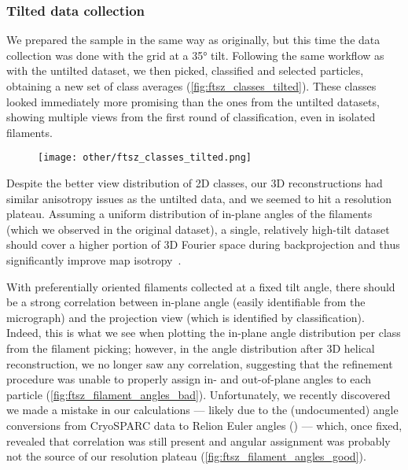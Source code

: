 \subsubsection{Tilted data collection}\label{ftsz_tilted}

We prepared the sample in the same way as originally, but this time the data collection was done with the grid at a 35° tilt.
Following the same workflow as with the untilted dataset, we then picked, classified and selected particles, obtaining a new set of class averages (\autoref{fig:ftsz_classes_tilted}).
These classes looked immediately more promising than the ones from the untilted datasets, showing multiple views from the first round of classification, even in isolated filaments. %

\begin{figure}[ht]
    \centering
    \texttt{[image: other/ftsz\_classes\_tilted.png]}
    \label{fig:ftsz_classes_tilted}
\end{figure}

Despite the better view distribution of 2D classes, our 3D reconstructions had similar anisotropy issues as the untilted data, and we seemed to hit a resolution plateau.
Assuming a uniform distribution of in-plane angles of the filaments (which we observed in the original dataset), a single, relatively high-tilt dataset should cover a higher portion of 3D Fourier space during backprojection and thus significantly improve map isotropy~\cite{tanAddressingPreferredSpecimen2017}.

With preferentially oriented filaments collected at a fixed tilt angle, there should be a strong correlation between in-plane angle (easily identifiable from the micrograph) and the projection view (which is identified by classification).
Indeed, this is what we see when plotting the in-plane angle distribution per class from the filament picking;
however, in the angle distribution after 3D helical reconstruction, we no longer saw any correlation, suggesting that the refinement procedure was unable to properly assign in- and out-of-plane angles to each particle (\autoref{fig:ftsz_filament_angles_bad}).
Unfortunately, we recently discovered we made a mistake in our calculations --- likely due to the (undocumented) angle conversions from CryoSPARC data to Relion Euler angles () --- which, once fixed, revealed that correlation was still present and angular assignment was probably not the source of our resolution plateau (\autoref{fig:ftsz_filament_angles_good}).

